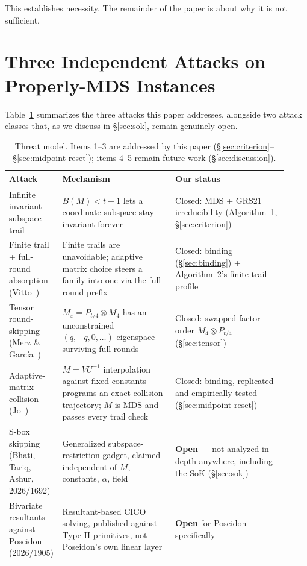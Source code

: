 \documentclass[11pt]{article}
\begin{document}
This establishes necessity. The remainder of the paper is about why it is
not sufficient.

\section{Three Independent Attacks on Properly-MDS Instances}
\label{sec:threats}

Table~\ref{tab:threats} summarizes the three attacks this paper addresses,
alongside two attack classes that, as we discuss in
\S\ref{sec:sok}, remain genuinely open.

\begin{table}[h!]
\centering
\caption{Threat model. Items 1--3 are addressed by this paper
(\S\ref{sec:criterion}--\S\ref{sec:midpoint-reset}); items 4--5 remain
future work (\S\ref{sec:discussion}).}
\label{tab:threats}
\small
\begin{tabular}{@{}p{0.12\linewidth}p{0.4\linewidth}p{0.4\linewidth}@{}}
\toprule
\textbf{Attack} & \textbf{Mechanism} & \textbf{Our status} \\
\midrule
Infinite invariant subspace trail &
$B(M) < t+1$ lets a coordinate subspace stay invariant forever &
Closed: MDS + GRS21 irreducibility (Algorithm~1, \S\ref{sec:criterion}) \\
\addlinespace
Finite trail + full-round absorption (Vitto~\cite{vitto2026}) &
Finite trails are unavoidable; adaptive matrix choice steers a family into one via the full-round prefix &
Closed: binding (\S\ref{sec:binding}) + Algorithm~2's finite-trail profile \\
\addlinespace
Tensor round-skipping (Merz \& Garc\'ia~\cite{merzgarcia2026}) &
$M_\varepsilon = P_{t/4}\otimes M_4$ has an unconstrained $(q,-q,0,\dots)$ eigenspace surviving full rounds &
Closed: swapped factor order $M_4\otimes P_{t/4}$ (\S\ref{sec:tensor}) \\
\addlinespace
Adaptive-matrix collision (Jo~\cite{jo2026}) &
$M=VU^{-1}$ interpolation against fixed constants programs an exact collision trajectory; $M$ is MDS and passes every trail check &
Closed: binding, replicated and empirically tested (\S\ref{sec:midpoint-reset}) \\
\addlinespace
S-box skipping~\cite{sboxskip2026} (Bhati, Tariq, Ashur, 2026/1692) &
Generalized subspace-restriction gadget, claimed independent of $M$, constants, $\alpha$, field &
\textbf{Open} --- not analyzed in depth anywhere, including the SoK (\S\ref{sec:sok}) \\
\addlinespace
Bivariate resultants against Poseidon~\cite{resultant2026} (2026/1905) &
Resultant-based CICO solving, published against Type-II primitives, not Poseidon's own linear layer &
\textbf{Open} for Poseidon specifically \\
\bottomrule
\end{tabular}
\end{table}
\end{document}
